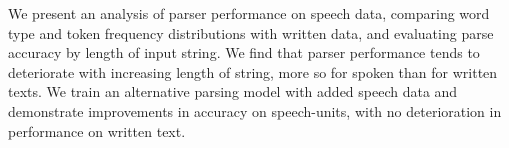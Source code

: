 We present an analysis of parser performance on speech data, comparing word type and token frequency distributions with written data, and evaluating parse accuracy by length of input string. We find that parser performance tends to deteriorate with increasing length of string, more so for spoken than for written texts. We train an alternative parsing model with added speech data and demonstrate improvements in accuracy on speech-units, with no deterioration in performance on written text.
